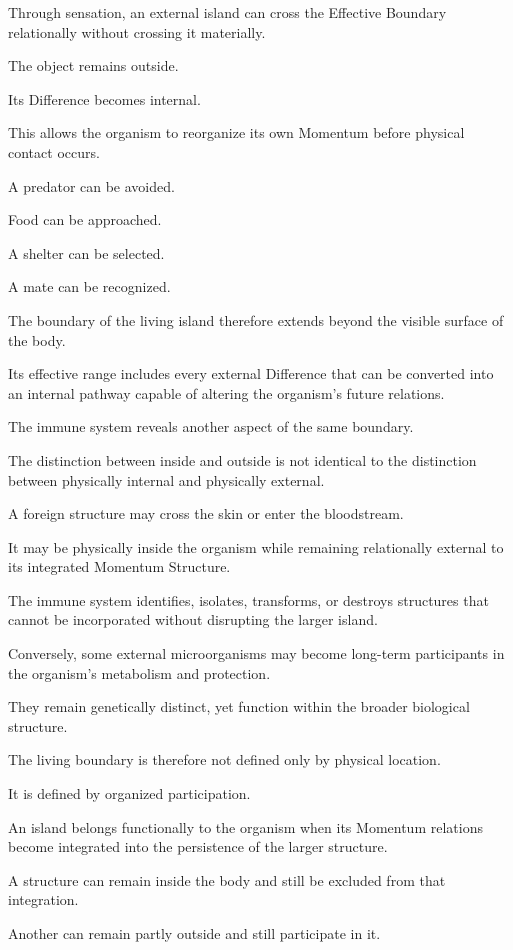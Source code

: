 Through sensation, an external island can cross the Effective Boundary relationally without crossing it materially.

The object remains outside.

Its Difference becomes internal.

This allows the organism to reorganize its own Momentum before physical contact occurs.

A predator can be avoided.

Food can be approached.

A shelter can be selected.

A mate can be recognized.

The boundary of the living island therefore extends beyond the visible surface of the body.

Its effective range includes every external Difference that can be converted into an internal pathway capable of altering the organism’s future relations.

The immune system reveals another aspect of the same boundary.

The distinction between inside and outside is not identical to the distinction between physically internal and physically external.

A foreign structure may cross the skin or enter the bloodstream.

It may be physically inside the organism while remaining relationally external to its integrated Momentum Structure.

The immune system identifies, isolates, transforms, or destroys structures that cannot be incorporated without disrupting the larger island.

Conversely, some external microorganisms may become long-term participants in the organism’s metabolism and protection.

They remain genetically distinct, yet function within the broader biological structure.

The living boundary is therefore not defined only by physical location.

It is defined by organized participation.

An island belongs functionally to the organism when its Momentum relations become integrated into the persistence of the larger structure.

A structure can remain inside the body and still be excluded from that integration.

Another can remain partly outside and still participate in it.

